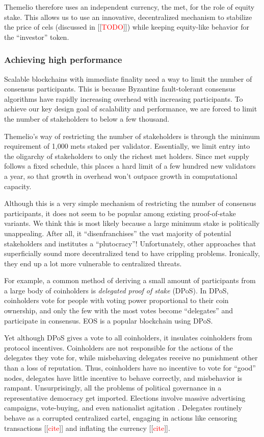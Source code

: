 \documentclass[headinclude]{scrbook}
\newcommand\mytodo[1]{[[\textcolor{red}{#1}]]}
\begin{document}
Themelio therefore uses an independent currency, the met, for the role of equity stake. This allows us to use an innovative, decentralized mechanism to stabilize the price of cels (discussed in \mytodo{TODO}) while keeping equity-like behavior for the ``investor'' token.

\subsubsection{Achieving high performance}

Scalable blockchains with immediate finality need a way to limit the number of consensus participants. This is because Byzantine fault-tolerant consensus algorithms have rapidly increasing overhead with increasing participants. To achieve our key design goal of scalability and performance, we are forced to limit the number of stakeholders to below a few thousand.

Themelio's way of restricting the number of stakeholders is through the minimum requirement of 1,000 mets staked per validator. Essentially, we limit entry into the oligarchy of stakeholders to only the richest met holders. Since met supply follows a fixed schedule, this places a hard limit of a few hundred new validators a year, so that growth in overhead won't outpace growth in computational capacity.

Although this is a very simple mechanism of restricting the number of consensus participants, it does not seem to be popular among existing proof-of-stake variants. We think this is most likely because a large minimum stake is politically unappealing. After all, it ``disenfranchises'' the vast majority of potential stakeholders and institutes a ``plutocracy''! Unfortunately, other approaches that superficially sound more decentralized tend to have crippling problems. Ironically, they end up a lot more vulnerable to centralized threats.

For example, a common method of deriving a small amount of participants from a large body of coinholders is \textit{delegated proof of stake} (DPoS). In DPoS, coinholders vote for people with voting power proportional to their coin ownership, and only the few with the most votes become ``delegates'' and participate in consensus. EOS is a popular blockchain using DPoS.

Yet although DPoS gives a vote to all coinholders, it insulates coinholders from protocol incentives. Coinholders are not responsible for the actions of the delegates they vote for, while misbehaving delegates receive no punishment other than a loss of reputation. Thus, coinholders have no incentive to vote for ``good'' nodes, delegates have little incentive to behave correctly, and misbehavior is rampant. Unsurprisingly, all the problems of political governance in a representative democracy get imported. Elections involve massive advertising campaigns, vote-buying, and even nationalist agitation \cite{zhihu2019votebuy}. Delegates routinely behave as a corrupted centralized cartel, engaging in actions like censoring transactions \mytodo{cite} and inflating the currency \mytodo{cite}.
\end{document}
